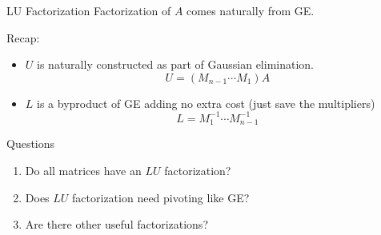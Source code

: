 \documentclass[10pt]{beamer}
\begin{document}
\begin{frame}{LU Factorization}
    {Factorization of $A$ comes naturally from GE.}

\vspace{3mm}
Recap:
\begin{itemize}
    \item $U$ is naturally constructed as part of Gaussian elimination.
        $$U = (M_{n-1}\cdots M_1)A$$
    \item $L$ is a byproduct of GE adding no extra cost (just save the multipliers) 
        $$ L = M_1^{-1} \cdots M_{n-1}^{-1}$$
\end{itemize}
\end{frame}
\begin{frame}{Questions}

\begin{enumerate}
    \item Do all matrices have an $LU$ factorization? 
\vfill
    \item Does $LU$ factorization need pivoting like GE?
\vfill
    \item Are there other useful factorizations? 
\vfill
\end{enumerate}
    
\end{frame}


\end{document}
